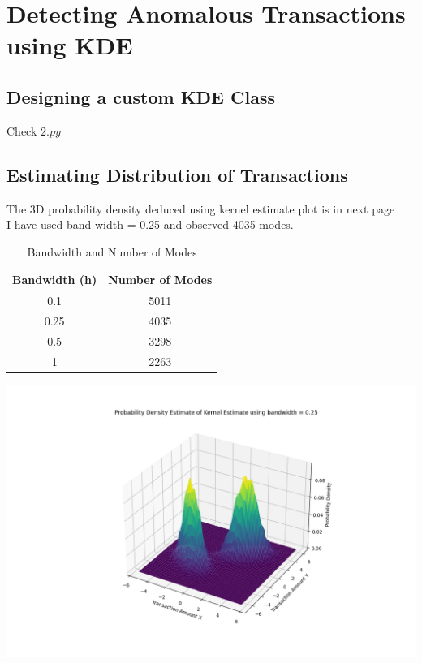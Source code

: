 \documentclass[12pt]{article}
\begin{document}
\section{Detecting Anomalous Transactions using KDE}
\subsection{Designing a custom KDE Class}
Check $2.py$
\subsection{Estimating Distribution of Transactions}
The 3D probability density deduced using kernel estimate plot is in next page \\ 
I have used band width = 0.25 and observed 4035 modes. \\
\begin{table}[h]
    \centering
    \begin{tabular}{cc}
    \hline
    \textbf{Bandwidth (h)} & \textbf{Number of Modes} \\ \hline
    0.1 & 5011 \\
    0.25 & 4035 \\
    0.5 & 3298 \\
    1 & 2263 \\ \hline
    \end{tabular}
    \caption{Bandwidth and Number of Modes}
    \label{tab:bandwidth_modes}
    \end{table}
\begin{minipage}{\linewidth}
    \begin{center}
        \includegraphics[width=\textwidth]{images/transaction_distribution.png}
    \end{center}
\end{minipage}
\end{document}
